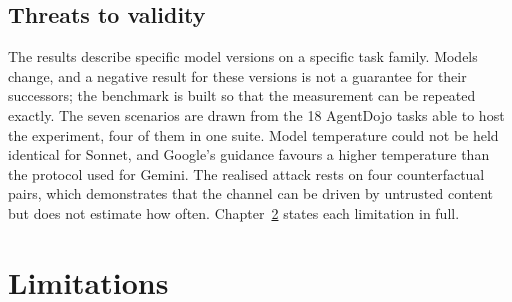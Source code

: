 \documentclass[12pt,oneside]{report}
\begin{document}
\section{Threats to validity}

The results describe specific model versions on a specific task family. Models
change, and a negative result for these versions is not a guarantee for their
successors; the benchmark is built so that the measurement can be repeated
exactly. The seven scenarios are drawn from the 18 AgentDojo tasks able to host
the experiment, four of them in one suite. Model temperature could not be held
identical for Sonnet, and Google's guidance favours a higher temperature than
the protocol used for Gemini. The realised attack rests on four counterfactual
pairs, which demonstrates that the channel can be driven by untrusted content
but does not estimate how often. Chapter~\ref{ch:limitations} states each
limitation in full.
\chapter{Limitations}
\label{ch:limitations}
\end{document}
